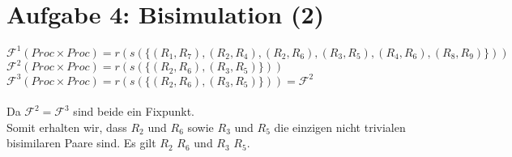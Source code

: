 \section*{Aufgabe 4: Bisimulation (2)}

$\mathcal{F}^{1}(Proc \times Proc) = r(s(\{(R_1, R_7),(R_2, R_4),(R_2, R_6),(R_3, R_5),(R_4, R_6),(R_8, R_9)\}))$
\\
$\mathcal{F}^{2}(Proc \times Proc) = r(s(\{(R_2, R_6),(R_3, R_5)\}))$
\\
$\mathcal{F}^{3}(Proc \times Proc) = r(s(\{(R_2, R_6),(R_3, R_5)\})) = \mathcal{F}^{2}$
\\\\
Da $\mathcal{F}^{2} = \mathcal{F}^{3}$ sind beide ein Fixpunkt.
\\
Somit erhalten wir, dass $R_2$ und $R_6$ sowie $R_3$ und $R_5$ die einzigen nicht trivialen bisimilaren Paare sind. Es gilt $R_2$ \bisim $R_6$ und $R_3$ \bisim $R_5$.
